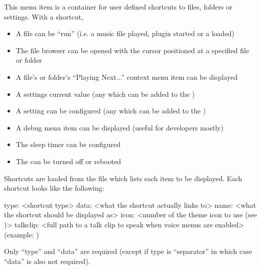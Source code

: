 This menu item is a container for user defined shortcuts to files, folders or
settings. With a shortcut,
\begin{itemize}
  \item A file can be ``run'' (i.e. a music file played, plugin started or
        a  loaded)
  \item The file browser can be opened with the cursor positioned at
        a specified file or folder
  \item A file's or folder's ``Playing Next...'' context menu item can
        be displayed
  \item A settings current value (any which can be added to the
        )
  \item A setting can be configured (any which can be added to the
        )
  \item A debug menu item can be displayed (useful for developers mostly)
  \item The sleep timer can be configured
  \item The \dap{} can be turned off or rebooted
\end{itemize}


Shortcuts are loaded from the file  which lists
each item to be displayed. Each shortcut looks like the following:

\begin{example}
    [shortcut]
    type: <shortcut type>
    data: <what the shortcut actually links to>
    name: <what the shortcut should be displayed as>
    icon: <number of the theme icon to use (see )>
    talkclip: <full path to a talk clip to speak when voice menus are enabled> (example: )
\end{example}

Only ``type'' and ``data'' are required (except if type is ``separator'' in which case
``data'' is also not required).

